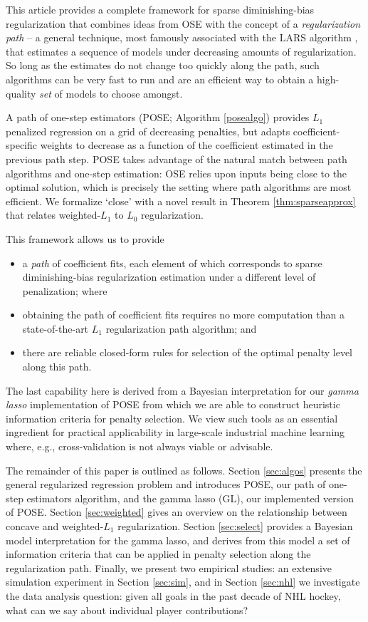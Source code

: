 \documentclass[twoside]{article}
\begin{document}
This article provides a complete framework for sparse diminishing-bias
regularization that combines ideas from OSE with the concept of a
\textit{regularization path} -- a general technique, most famously associated
with the LARS algorithm \citep{efron_least_2004}, that estimates a sequence of
models under decreasing amounts of regularization.  So long as the estimates do not change too quickly along the path, such  algorithms can be very fast to run and are an efficient way to obtain a high-quality \textit{set} of models to choose amongst.  

A path of one-step estimators (POSE; Algorithm \ref{posealgo})
provides $L_1$ penalized regression  on a grid of decreasing
penalties, but adapts coefficient-specific weights to decrease as a function
of the coefficient estimated in the previous path step.  POSE takes advantage
of the natural match between path algorithms and one-step estimation: OSE
relies upon inputs being close to the optimal solution, which is precisely the
setting where path algorithms are most efficient.  We formalize `close' with a novel result in Theorem \ref{thm:sparseapprox} that relates weighted-$L_1$ to $L_0$ regularization.

This framework allows us to provide 
\begin{itemize}
\item a {\it path} of coefficient fits, each element of which corresponds to sparse diminishing-bias regularization estimation under a different level of penalization; where
\item obtaining the path of coefficient fits requires no more computation than  a state-of-the-art $L_1$ regularization path algorithm; and
\item there are reliable closed-form rules for selection of the optimal penalty level along this path.
\end{itemize}
The last capability here is derived from a Bayesian interpretation for our \textit{gamma lasso} implementation of POSE from which we are able to construct heuristic information criteria for penalty selection.
We view such tools as an essential ingredient for practical applicability in large-scale industrial machine learning where, e.g., cross-validation is not always viable or advisable.


The remainder of this paper is outlined as follows.  Section \ref{sec:algos}
presents the general regularized regression problem and introduces POSE, our
path of one-step estimators algorithm, and the gamma lasso (GL), our
implemented version of POSE.  Section \ref{sec:weighted} gives an overview on
the relationship between concave and weighted-$L_1$ regularization. Section \ref{sec:select} provides a Bayesian model interpretation
for the gamma lasso, and derives from this model a set of information criteria
that can be applied in penalty selection along the regularization path.
Finally, we present two empirical studies:
an extensive  simulation experiment in Section \ref{sec:sim}, and in Section \ref{sec:nhl} we investigate the data analysis question: given all goals in the past decade of NHL hockey, what can we say about individual player contributions? 
\end{document}

